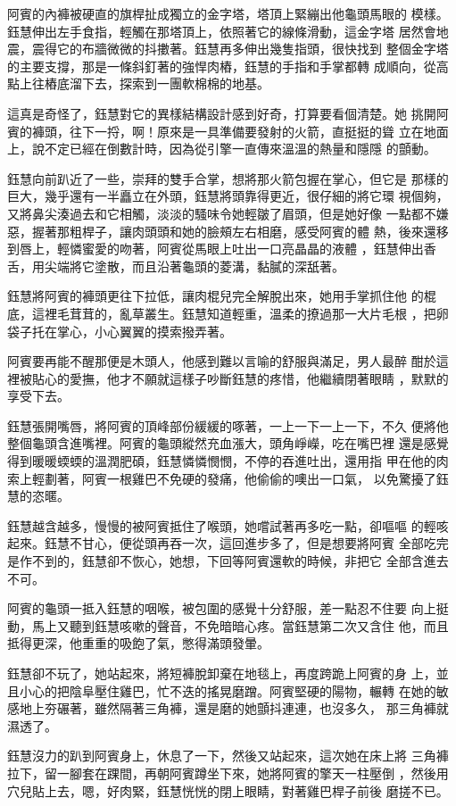 阿賓的內褲被硬直的旗桿扯成獨立的金字塔，塔頂上緊繃出他龜頭馬眼的
模樣。鈺慧伸出左手食指，輕觸在那塔頂上，依照著它的線條滑動，這金字塔
居然會地震，震得它的布牆微微的抖擻著。鈺慧再多伸出幾隻指頭，很快找到
整個金字塔的主要支撐，那是一條斜釘著的強悍肉樁，鈺慧的手指和手掌都轉
成順向，從高點上往樁底溜下去，探索到一團軟棉棉的地基。

這真是奇怪了，鈺慧對它的異樣結構設計感到好奇，打算要看個清楚。她
挑開阿賓的褲頭，往下一捋，啊！原來是一具準備要發射的火箭，直挺挺的聳
立在地面上，說不定已經在倒數計時，因為從引擎一直傳來溫溫的熱量和隱隱
的顫動。

鈺慧向前趴近了一些，崇拜的雙手合掌，想將那火箭包握在掌心，但它是
那樣的巨大，幾乎還有一半矗立在外頭，鈺慧將頭靠得更近，很仔細的將它環
視個夠，又將鼻尖湊過去和它相觸，淡淡的騷味令她輕皺了眉頭，但是她好像
一點都不嫌惡，握著那粗桿子，讓肉頭頭和她的臉頰左右相磨，感受阿賓的體
熱，後來還移到唇上，輕憐蜜愛的吻著，阿賓從馬眼上吐出一口亮晶晶的液體
，鈺慧伸出香舌，用尖端將它塗散，而且沿著龜頭的菱溝，黏膩的深舐著。

鈺慧將阿賓的褲頭更往下拉低，讓肉棍兒完全解脫出來，她用手掌抓住他
的棍底，這裡毛茸茸的，亂草叢生。鈺慧知道輕重，溫柔的撩過那一大片毛根
，把卵袋子托在掌心，小心翼翼的摸索撥弄著。

阿賓要再能不醒那便是木頭人，他感到難以言喻的舒服與滿足，男人最醉
酣於這裡被貼心的愛撫，他才不願就這樣子吵斷鈺慧的疼惜，他繼續閉著眼睛
，默默的享受下去。

鈺慧張開嘴唇，將阿賓的頂峰部份緩緩的啄著，一上一下一上一下，不久
便將他整個龜頭含進嘴裡。阿賓的龜頭縱然充血漲大，頭角崢嶸，吃在嘴巴裡
還是感覺得到暖暖蝡蝡的溫潤肥碩，鈺慧憐憐憫憫，不停的吞進吐出，還用指
甲在他的肉索上輕劃著，阿賓一根雞巴不免硬的發痛，他偷偷的噢出一口氣，
以免驚擾了鈺慧的恣暱。

鈺慧越含越多，慢慢的被阿賓抵住了喉頭，她嚐試著再多吃一點，卻嘔嘔
的輕咳起來。鈺慧不甘心，便從頭再吞一次，這回進步多了，但是想要將阿賓
全部吃完是作不到的，鈺慧卻不恢心，她想，下回等阿賓還軟的時候，非把它
全部含進去不可。

阿賓的龜頭一抵入鈺慧的咽喉，被包圍的感覺十分舒服，差一點忍不住要
向上挺動，馬上又聽到鈺慧咳嗽的聲音，不免暗暗心疼。當鈺慧第二次又含住
他，而且抵得更深，他重重的吸飽了氣，憋得滿頭發暈。

鈺慧卻不玩了，她站起來，將短褲脫卸棄在地毯上，再度跨跪上阿賓的身
上，並且小心的把陰阜壓住雞巴，忙不迭的搖晃磨蹭。阿賓堅硬的陽物，輾轉
在她的敏感地上夯碾著，雖然隔著三角褲，還是磨的她顫抖連連，也沒多久，
那三角褲就濕透了。

鈺慧沒力的趴到阿賓身上，休息了一下，然後又站起來，這次她在床上將
三角褲拉下，留一腳套在踝間，再朝阿賓蹲坐下來，她將阿賓的擎天一柱壓倒
，然後用穴兒貼上去，嗯，好肉緊，鈺慧恍恍的閉上眼睛，對著雞巴桿子前後
磨搓不已。

